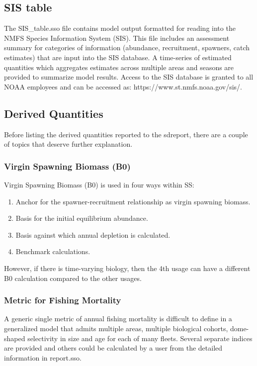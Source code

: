 \subsection{SIS table}
The SIS\_table.sso file contains model output formatted for reading into the NMFS Species Information System (SIS).  This file includes an assessment summary for categories of information (abundance, recruitment, spawners, catch estimates) that are input into the SIS database.  A time-series of estimated quantities which aggregates estimates across multiple areas and seasons are provided to summarize model results.  Access to the SIS database is granted to all NOAA employees and can be accessed as: https://www.st.nmfs.noaa.gov/sis/.

\subsection{Derived Quantities}
Before listing the derived quantities reported to the sdreport, there are a couple of topics that deserve further explanation.

\subsubsection{Virgin Spawning Biomass (B0)}
Virgin Spawning Biomass (B0) is used in four ways within SS:
\begin{enumerate}
	\item Anchor for the spawner-recruitment relationship as virgin spawning biomass.
	\item Basis for the initial equilibrium abundance. 
	\item Basis against which annual depletion is calculated.
	\item Benchmark calculations.
\end{enumerate}
However, if there is time-varying biology, then the 4th usage can have a different B0 calculation compared to the other usages.

\subsubsection{Metric for Fishing Mortality}
A generic single metric of annual fishing mortality is difficult to define in a generalized model that admits multiple areas, multiple biological cohorts, dome-shaped selectivity in size and age for each of many fleets.  Several separate indices are provided and others could be calculated by a user from the detailed information in report.sso.

